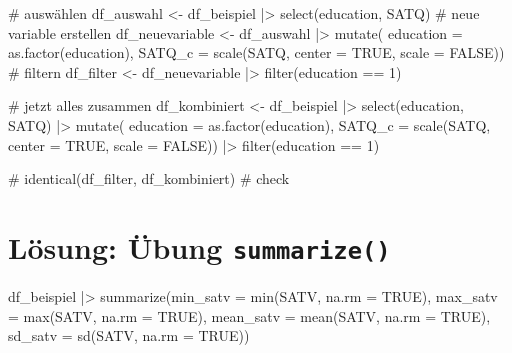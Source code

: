\documentclass[
  letterpaper,
  DIV=11,
  numbers=noendperiod]{scrreprt}
\newenvironment{Shaded}{\begin{snugshade}}{\end{snugshade}}
\newcommand{\AttributeTok}[1]{\textcolor[rgb]{0.40,0.45,0.13}{#1}}
\newcommand{\CommentTok}[1]{\textcolor[rgb]{0.37,0.37,0.37}{#1}}
\newcommand{\ConstantTok}[1]{\textcolor[rgb]{0.56,0.35,0.01}{#1}}
\newcommand{\DecValTok}[1]{\textcolor[rgb]{0.68,0.00,0.00}{#1}}
\newcommand{\FunctionTok}[1]{\textcolor[rgb]{0.28,0.35,0.67}{#1}}
\newcommand{\NormalTok}[1]{\textcolor[rgb]{0.00,0.23,0.31}{#1}}
\newcommand{\OtherTok}[1]{\textcolor[rgb]{0.00,0.23,0.31}{#1}}
\newcommand{\SpecialCharTok}[1]{\textcolor[rgb]{0.37,0.37,0.37}{#1}}
\begin{document}
\begin{Shaded}
\begin{Highlighting}[]
\CommentTok{\# auswählen}
\NormalTok{df\_auswahl }\OtherTok{\textless{}{-}}\NormalTok{ df\_beispiel }\SpecialCharTok{|\textgreater{}} \FunctionTok{select}\NormalTok{(education, SATQ)}
\CommentTok{\# neue variable erstellen}
\NormalTok{df\_neuevariable }\OtherTok{\textless{}{-}}\NormalTok{ df\_auswahl }\SpecialCharTok{|\textgreater{}} \FunctionTok{mutate}\NormalTok{(}
  \AttributeTok{education =} \FunctionTok{as.factor}\NormalTok{(education),}
  \AttributeTok{SATQ\_c =} \FunctionTok{scale}\NormalTok{(SATQ, }\AttributeTok{center =} \ConstantTok{TRUE}\NormalTok{, }\AttributeTok{scale =} \ConstantTok{FALSE}\NormalTok{))}
\CommentTok{\# filtern}
\NormalTok{df\_filter }\OtherTok{\textless{}{-}}\NormalTok{ df\_neuevariable }\SpecialCharTok{|\textgreater{}} \FunctionTok{filter}\NormalTok{(education }\SpecialCharTok{==} \DecValTok{1}\NormalTok{)}

\CommentTok{\# jetzt alles zusammen}
\NormalTok{df\_kombiniert }\OtherTok{\textless{}{-}}\NormalTok{ df\_beispiel }\SpecialCharTok{|\textgreater{}} 
  \FunctionTok{select}\NormalTok{(education, SATQ) }\SpecialCharTok{|\textgreater{}} 
  \FunctionTok{mutate}\NormalTok{(}
  \AttributeTok{education =} \FunctionTok{as.factor}\NormalTok{(education),}
  \AttributeTok{SATQ\_c =} \FunctionTok{scale}\NormalTok{(SATQ, }\AttributeTok{center =} \ConstantTok{TRUE}\NormalTok{, }\AttributeTok{scale =} \ConstantTok{FALSE}\NormalTok{)) }\SpecialCharTok{|\textgreater{}} 
  \FunctionTok{filter}\NormalTok{(education }\SpecialCharTok{==} \DecValTok{1}\NormalTok{)}

\CommentTok{\# identical(df\_filter, df\_kombiniert) \# check}
\end{Highlighting}
\end{Shaded}

\section{\texorpdfstring{Lösung: Übung
\texttt{summarize()}}{Lösung: Übung summarize()}}\label{luxf6sung-uxfcbung-summarize}

\begin{Shaded}
\begin{Highlighting}[]
\NormalTok{df\_beispiel }\SpecialCharTok{|\textgreater{}} 
  \FunctionTok{summarize}\NormalTok{(}\AttributeTok{min\_satv =} \FunctionTok{min}\NormalTok{(SATV, }\AttributeTok{na.rm =} \ConstantTok{TRUE}\NormalTok{),}
            \AttributeTok{max\_satv =} \FunctionTok{max}\NormalTok{(SATV, }\AttributeTok{na.rm =} \ConstantTok{TRUE}\NormalTok{),}
            \AttributeTok{mean\_satv =} \FunctionTok{mean}\NormalTok{(SATV, }\AttributeTok{na.rm =} \ConstantTok{TRUE}\NormalTok{),}
            \AttributeTok{sd\_satv =} \FunctionTok{sd}\NormalTok{(SATV, }\AttributeTok{na.rm =} \ConstantTok{TRUE}\NormalTok{))}
\end{Highlighting}
\end{Shaded}
\end{document}
